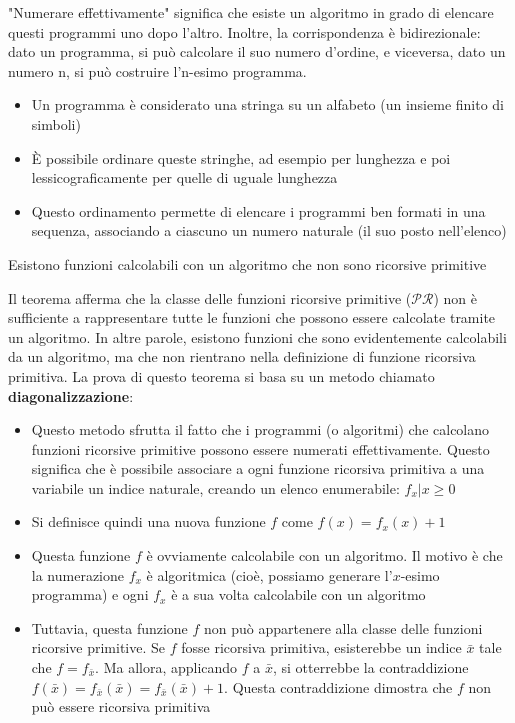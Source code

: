 \documentclass[12pt, a4paper]{report}
\begin{document}
                "Numerare effettivamente" significa che esiste un algoritmo in grado di elencare questi programmi uno dopo l'altro. Inoltre, la corrispondenza è bidirezionale: dato un programma, si può calcolare il suo numero d'ordine, e viceversa, dato un numero n, si può costruire l'n-esimo programma.
                \begin{itemize}
                    \item Un programma è considerato una stringa su un alfabeto (un insieme finito di simboli)
                    \item È possibile ordinare queste stringhe, ad esempio per lunghezza e poi lessicograficamente per quelle di uguale lunghezza
                    \item Questo ordinamento permette di elencare i programmi ben formati in una sequenza, associando a ciascuno un numero naturale (il suo posto nell'elenco)
                \end{itemize}
                \begin{theorembox}{}{}
                    Esistono funzioni calcolabili con un algoritmo che non sono ricorsive primitive
                \end{theorembox}
                 Il teorema afferma che la classe delle funzioni ricorsive primitive ($\mathcal{PR}$) non è sufficiente a rappresentare tutte le funzioni che possono essere calcolate tramite un algoritmo. In altre parole, esistono funzioni che sono evidentemente calcolabili da un algoritmo, ma che non rientrano nella definizione di funzione ricorsiva primitiva. La prova di questo teorema si basa su un metodo chiamato \textbf{diagonalizzazione}:
                 \begin{itemize}
                    \item Questo metodo sfrutta il fatto che i programmi (o algoritmi) che calcolano funzioni ricorsive primitive possono essere numerati effettivamente. Questo significa che è possibile associare a ogni funzione ricorsiva primitiva a una variabile un indice naturale, creando un elenco enumerabile: ${f_x | x \ge 0}$
                    \item Si definisce quindi una nuova funzione $f$ come $f(x) = f_x(x) + 1$
                    \item Questa funzione $f$ è ovviamente calcolabile con un algoritmo. Il motivo è che la numerazione $f_x$ è algoritmica (cioè, possiamo generare l'$x$-esimo programma) e ogni $f_x$ è a sua volta calcolabile con un algoritmo
                    \item Tuttavia, questa funzione $f$ non può appartenere alla classe delle funzioni ricorsive primitive. Se $f$ fosse ricorsiva primitiva, esisterebbe un indice $\bar{x}$ tale che $f = f_{\bar{x}}$. Ma allora, applicando $f$ a $\bar{x}$, si otterrebbe la contraddizione $f(\bar{x}) = f_{\bar{x}}(\bar{x}) = f_{\bar{x}}(\bar{x}) + 1$. Questa contraddizione dimostra che $f$ non può essere ricorsiva primitiva
                 \end{itemize}
\end{document}
